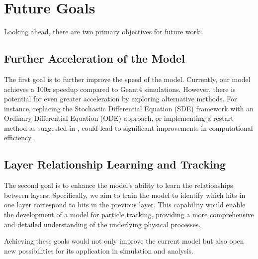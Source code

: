 \chapter{Future Goals}

Looking ahead, there are two primary objectives for future work:

\section{Further Acceleration of the Model}
The first goal is to further improve the speed of the model. Currently, our model achieves a 100x speedup compared to Geant4 simulations. However, there is potential for even greater acceleration by exploring alternative methods. For instance, replacing the Stochastic Differential Equation (SDE) framework with an Ordinary Differential Equation (ODE) approach, or implementing a restart method as suggested in \cite{restart}, could lead to significant improvements in computational efficiency.

\section{Layer Relationship Learning and Tracking}
The second goal is to enhance the model's ability to learn the relationships between layers. Specifically, we aim to train the model to identify which hits in one layer correspond to hits in the previous layer. This capability would enable the development of a model for particle tracking, providing a more comprehensive and detailed understanding of the underlying physical processes.

Achieving these goals would not only improve the current model but also open new possibilities for its application in simulation and analysis.

